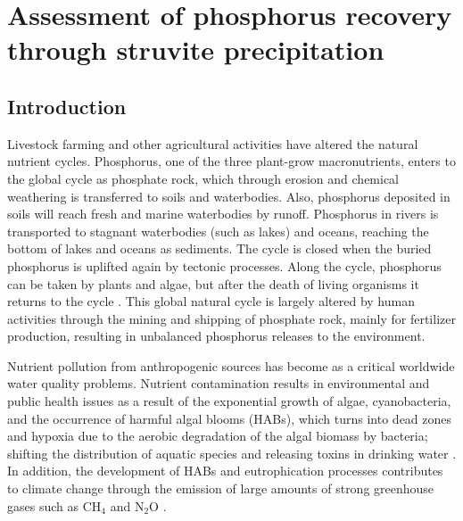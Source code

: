 \chapter{Assessment of phosphorus recovery through struvite precipitation}\label{ch:Struvite}
\begin{refsection}[referencesCh3]
\section{Introduction}
Livestock farming and other agricultural activities have altered the natural nutrient cycles. Phosphorus, one of the three plant-grow macronutrients, enters to the global cycle as phosphate rock, which through erosion and chemical weathering is transferred to soils and waterbodies. Also, phosphorus deposited in soils will reach fresh and marine waterbodies by runoff. Phosphorus in rivers is transported to stagnant waterbodies (such as lakes) and oceans, reaching the bottom of lakes and oceans as sediments. The cycle is closed when the buried phosphorus is uplifted again by tectonic processes. Along the cycle, phosphorus can be taken by plants and algae, but after the death of living organisms it returns to the cycle \citep{RUTTENBERG2001401}. This global natural cycle is largely altered by human activities through the mining and shipping of phosphate rock, mainly for fertilizer production, resulting in unbalanced phosphorus releases to the environment.

Nutrient pollution from anthropogenic sources has become as a critical worldwide water quality problems. Nutrient contamination results in environmental and public health issues as a result of the exponential growth of algae, cyanobacteria, and the occurrence of harmful algal blooms (HABs), which turns into dead zones and hypoxia due to the aerobic degradation of the algal biomass by bacteria; shifting the distribution of aquatic species and releasing toxins in drinking water \citep{Sampat2}. In addition, the development of HABs and eutrophication processes contributes to climate change through the emission of large amounts of strong greenhouse gases such as $\text{CH}_{4}$ and $\text{N}_{2}\text{O}$ \citep{Beaulieu}.


\end{refsection}
